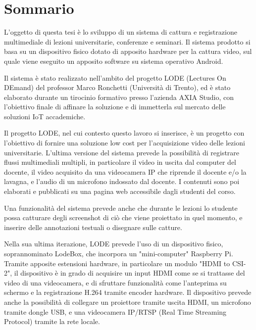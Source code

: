 \chapter*{Sommario} %
\label{sommario}


L'oggetto di questa tesi è lo sviluppo di un sistema di cattura e registrazione multimediale di lezioni universitarie, conferenze e seminari. Il sistema prodotto si basa su un dispositivo fisico dotato di apposito hardware per la cattura video, sul quale viene eseguito un apposito software su sistema operativo Android.

Il sistema è stato realizzato nell'ambito del progetto LODE (Lectures On DEmand) del professor Marco Ronchetti (Università di Trento), ed è stato elaborato durante un tirocinio formativo presso l'azienda AXIA Studio, con l'obiettivo finale di affinare la soluzione e di immetterla sul mercato delle soluzioni IoT accademiche.

Il progetto LODE, nel cui contesto questo lavoro si inserisce, è un progetto con l'obiettivo di fornire una soluzione low cost per l'acquisizione video delle lezioni universitarie. L'ultima versione del sistema prevede la possibilità di registrare flussi multimediali multipli, in particolare il video in uscita dal computer del docente, il video acquisito da una videocamera IP che riprende il docente e/o la lavagna, e l'audio di un microfono indossato dal docente. I contenuti sono poi elaborati e pubblicati su una pagina web accessibile dagli studenti del corso.

Una funzionalità del sistema prevede anche che durante le lezioni lo studente possa catturare degli screenshot di ciò che viene proiettato in quel momento, e inserire delle annotazioni testuali o disegnare sulle catture.

Nella sua ultima iterazione, LODE prevede l'uso di un dispositivo fisico, soprannominato LodeBox, che incorpora un "mini-computer" Raspberry Pi. Tramite apposite estensioni hardware, in particolare un modulo "HDMI to CSI-2", il dispositivo è in grado di acquisire un input HDMI come se si trattasse del video di una videocamera, e di sfruttare funzionalità come l'anteprima su schermo e la registrazione H.264 tramite encoder hardware. Il dispositivo prevede anche la possibilità di collegare un proiettore tramite uscita HDMI, un microfono tramite dongle USB, e una videocamera IP/RTSP (Real Time Streaming Protocol) tramite la rete locale.


